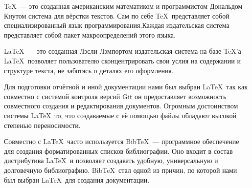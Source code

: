 \TeX\ --- это созданная американским математиком и программистом Дональдом Кнутом система для вёрстки текстов. Сам по себе \TeX\ представляет собой специализированный язык программирования.Каждая издательская система представляет собой пакет макроопределений этого языка.

\LaTeX\ --- это созданная Лэсли Лэмпортом издательская система на базе \TeX'а \cite{lvovskyi} \LaTeX\ позволяет пользователю сконцентрировать свои услия на содержании и структуре текста, не заботясь о деталях его оформления.

Для подготовки отчётной и иной документации нами был выбран \LaTeX\, так как совместно с системой контроля версий Git он предоставляет возможность совместного создания и редактирования документов. Огромным достоинством системы \LaTeX\ то, что создаваемые с её помощью файлы обладают высокой степенью переносимости. \cite{latexrus}

Совместно с \LaTeX\ часто используется Bib\TeX\ --- программное обеспечение для создания форматированных списков библиографии. Оно входит в состав дистрибутива \LaTeX\ и позволяет создавать удобную, универсальную и долговечную библиографию. Bib\TeX\ стал одной из причин, по которой нами был выбран \LaTeX\ для создания документации.
